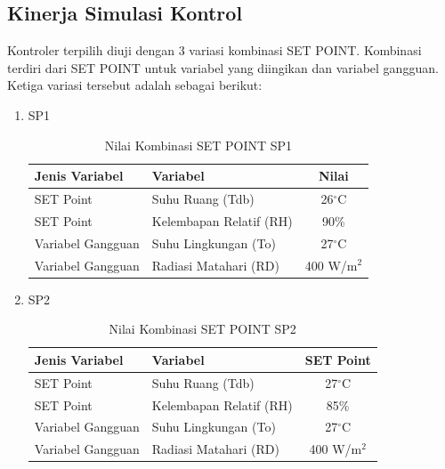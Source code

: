\subsection{Kinerja Simulasi Kontrol}

Kontroler terpilih diuji dengan 3 variasi kombinasi SET POINT. Kombinasi terdiri dari SET POINT untuk variabel yang diingikan dan variabel gangguan. Ketiga variasi tersebut adalah sebagai berikut:
\begin{enumerate}
	\item SP1
	\begin{table}[!h]
		\caption{Nilai Kombinasi SET POINT SP1}
		\label{tbl:5:SP1Combination}
		\centering
		\begin{tabular}{|l|l|c|}
			\hline
			\textbf{Jenis Variabel} & \textbf{Variabel} & \textbf{Nilai} \\ \hline
			SET Point & Suhu Ruang (Tdb) & 26$^\circ$C          \\ \hline
			SET Point & Kelembapan Relatif (RH) & 90\%         \\ \hline
			Variabel Gangguan & Suhu Lingkungan (To) & 27$^\circ$C           \\ \hline
			Variabel Gangguan & Radiasi Matahari (RD) & 400 W/m$^2$    \\ \hline
		\end{tabular}
	\end{table}
	
	\item SP2
	\begin{table}[!h]
		\caption{Nilai Kombinasi SET POINT SP2}
		\label{tbl:5:SP2Combination}
		\centering
		\begin{tabular}{|l|l|c|}
			\hline
			\textbf{Jenis Variabel} & \textbf{Variabel} & \textbf{SET Point} \\ \hline
			SET Point & Suhu Ruang (Tdb) & 27$^\circ$C          \\ \hline
			SET Point & Kelembapan Relatif (RH) & 85\%         \\ \hline
			Variabel Gangguan & Suhu Lingkungan (To) & 27$^\circ$C           \\ \hline
			Variabel Gangguan & Radiasi Matahari (RD) & 400 W/m$^2$    \\ \hline
		\end{tabular}
	\end{table}
	

\end{enumerate}
